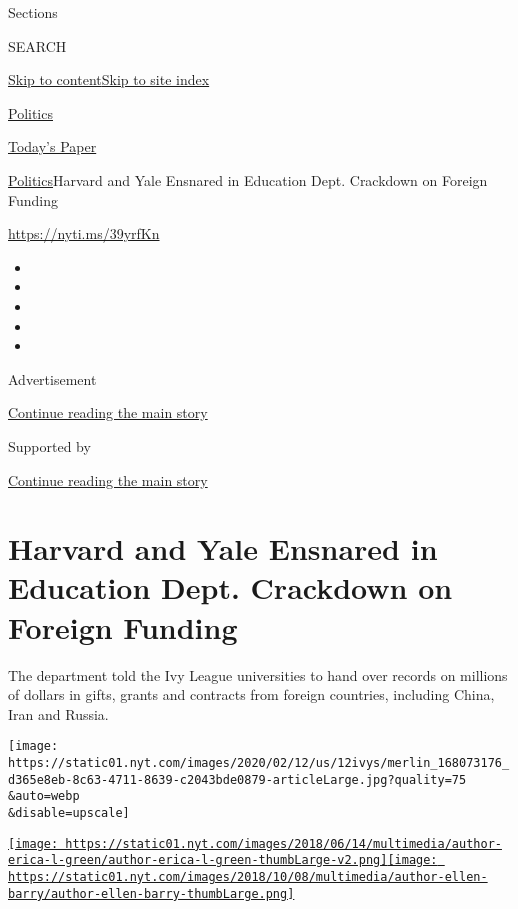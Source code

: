 Sections

SEARCH

\protect\hyperlink{site-content}{Skip to
content}\protect\hyperlink{site-index}{Skip to site index}

\href{https://www.nytimes.com/section/politics}{Politics}

\href{https://myaccount.nytimes.com/auth/login?response_type=cookie\&client_id=vi}{}

\href{https://www.nytimes.com/section/todayspaper}{Today's Paper}

\href{/section/politics}{Politics}\textbar{}Harvard and Yale Ensnared in
Education Dept. Crackdown on Foreign Funding

\url{https://nyti.ms/39yrfKn}

\begin{itemize}
\item
\item
\item
\item
\item
\end{itemize}

Advertisement

\protect\hyperlink{after-top}{Continue reading the main story}

Supported by

\protect\hyperlink{after-sponsor}{Continue reading the main story}

\hypertarget{harvard-and-yale-ensnared-in-education-dept-crackdown-on-foreign-funding}{%
\section{Harvard and Yale Ensnared in Education Dept. Crackdown on
Foreign
Funding}\label{harvard-and-yale-ensnared-in-education-dept-crackdown-on-foreign-funding}}

The department told the Ivy League universities to hand over records on
millions of dollars in gifts, grants and contracts from foreign
countries, including China, Iran and Russia.

\texttt{[image: https://static01.nyt.com/images/2020/02/12/us/12ivys/merlin\_168073176\_d365e8eb-8c63-4711-8639-c2043bde0879-articleLarge.jpg?quality=75\\\&auto=webp\\\&disable=upscale]}

\href{https://nytimes.com/by/erica-l-green}{\texttt{[image: https://static01.nyt.com/images/2018/06/14/multimedia/author-erica-l-green/author-erica-l-green-thumbLarge-v2.png]}}\href{https://www.nytimes.com/by/ellen-barry}{\texttt{[image: https://static01.nyt.com/images/2018/10/08/multimedia/author-ellen-barry/author-ellen-barry-thumbLarge.png]}}

